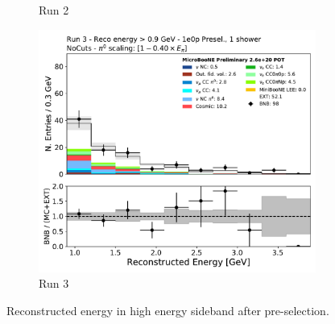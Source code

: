 \begin{figure}[H]
\begin{subfigure}{0.3\textwidth}
    \caption{Run 2}
    \end{subfigure}
    \begin{subfigure}{0.3\textwidth}
    \includegraphics[width=1.0\textwidth]{1e0p/High_E_Sideband/run3/reco_e_highe.pdf}
    \caption{Run 3}
    \end{subfigure}
    \caption{Reconstructed energy in high energy sideband after pre-selection.} 
    \label{fig:highe_0pbdt_timedep}
\end{figure}

